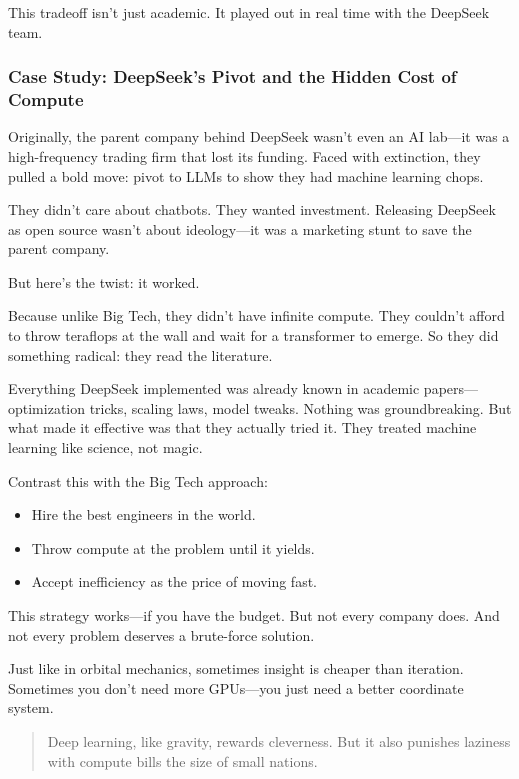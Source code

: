 This tradeoff isn’t just academic. It played out in real time with the DeepSeek team.

\subsubsection{Case Study: DeepSeek’s Pivot and the Hidden Cost of Compute}

Originally, the parent company behind DeepSeek wasn’t even an AI lab—it was a high-frequency trading firm that lost its funding. Faced with extinction, they pulled a bold move: pivot to LLMs to show they had machine learning chops.

They didn’t care about chatbots. They wanted investment. Releasing DeepSeek as open source wasn’t about ideology—it was a marketing stunt to save the parent company.

But here’s the twist: it worked.

Because unlike Big Tech, they didn’t have infinite compute. They couldn’t afford to throw teraflops at the wall and wait for a transformer to emerge. So they did something radical: they read the literature.

Everything DeepSeek implemented was already known in academic papers—optimization tricks, scaling laws, model tweaks. Nothing was groundbreaking. But what made it effective was that they actually tried it. They treated machine learning like science, not magic.

Contrast this with the Big Tech approach:

\begin{itemize}
  \item Hire the best engineers in the world.
  \item Throw compute at the problem until it yields.
  \item Accept inefficiency as the price of moving fast.
\end{itemize}

This strategy works—if you have the budget. But not every company does. And not every problem deserves a brute-force solution.

Just like in orbital mechanics, sometimes insight is cheaper than iteration. Sometimes you don’t need more GPUs—you just need a better coordinate system.

\begin{quote}
Deep learning, like gravity, rewards cleverness. But it also punishes laziness with compute bills the size of small nations.
\end{quote}

